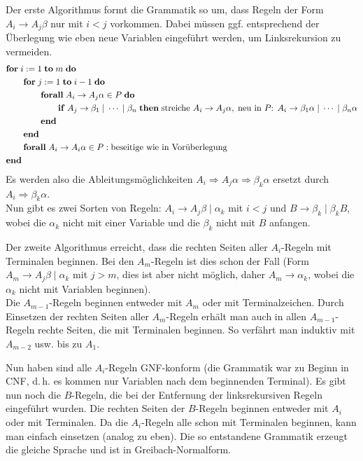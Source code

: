 \begin{Beweis}
    Der erste Algorithmus formt die Grammatik so um, dass Regeln der Form
    $A_i \rightarrow A_j \beta$ nur mit $i < j$ vorkommen.
    Dabei müssen ggf. entsprechend der Überlegung wie eben neue Variablen
    eingeführt werden, um Linksrekursion zu vermeiden.
    \begin{align*}&
        \mathbf{for}\; i := 1 \;\mathbf{to}\; m \;\mathbf{do}\;\\&
        \qquad\mathbf{for}\; j := 1 \;\mathbf{to}\; i - 1 \;\mathbf{do}\;\\&
        \qquad\qquad\mathbf{forall}\; A_i \rightarrow A_j \alpha \in P \;\mathbf{do}\;\\&
        \qquad\qquad\qquad\mathbf{if}\; A_j \rightarrow
        \beta_1 \;|\; \dotsb \;|\; \beta_n
        \;\mathbf{then}\; \text{streiche }A_i \rightarrow A_j \alpha,\;
        \text{neu in }P\text{: } A_i \rightarrow \beta_1 \alpha \;|\; \dotsb
        \;|\; \beta_n \alpha\\&
        \qquad\qquad\mathbf{end}\;\\&
        \qquad\mathbf{end}\;\\&
        \qquad\mathbf{forall}\; A_i \rightarrow A_i \alpha \in P:
        \text{beseitige wie in Vorüberlegung}\\&
        \mathbf{end}\;
    \end{align*}
    Es werden also die Ableitungsmöglichkeiten
    $A_i \Rightarrow A_j \alpha \Rightarrow \beta_k \alpha$ ersetzt durch
    $A_i \Rightarrow \beta_k \alpha$.\\
    Nun gibt es zwei Sorten von Regeln:
    $A_i \rightarrow A_j \beta \;|\; \alpha_k$ mit $i < j$ und
    $B \rightarrow \beta_k \;|\; \beta_k B$, wobei die
    $\alpha_k$ nicht mit einer Variable und die
    $\beta_k$ nicht mit $B$ anfangen.

    Der zweite Algorithmus erreicht, dass die rechten Seiten aller $A_i$-Regeln
    mit Terminalen beginnen.
    Bei den $A_m$-Regeln ist dies schon der Fall
    (Form $A_m \rightarrow A_j \beta \;|\; \alpha_k$ mit $j > m$,
    dies ist aber nicht möglich, daher
    $A_m \rightarrow \alpha_k$, wobei die $\alpha_k$ nicht mit Variablen
    beginnen).\\
    Die $A_{m-1}$-Regeln beginnen entweder mit $A_m$ oder mit Terminalzeichen.
    Durch Einsetzen der rechten Seiten aller $A_m$-Regeln erhält man auch in
    allen $A_{m-1}$-Regeln rechte Seiten, die mit Terminalen beginnen.
    So verfährt man induktiv mit $A_{m-2}$ usw. bis zu $A_1$.

    Nun haben sind alle $A_i$-Regeln GNF-konform
    (die Grammatik war zu Beginn in CNF, d.\,h. es kommen nur Variablen
    nach dem beginnenden Terminal).
    Es gibt nun noch die $B$-Regeln, die bei der Entfernung der linksrekursiven
    Regeln eingeführt wurden.
    Die rechten Seiten der $B$-Regeln beginnen entweder mit $A_i$ oder mit
    Terminalen.
    Da die $A_i$-Regeln alle schon mit Terminalen beginnen, kann man einfach
    einsetzen (analog zu eben).
    Die so entstandene Grammatik erzeugt die gleiche Sprache und ist in
    Greibach-Normalform.
\end{Beweis}

